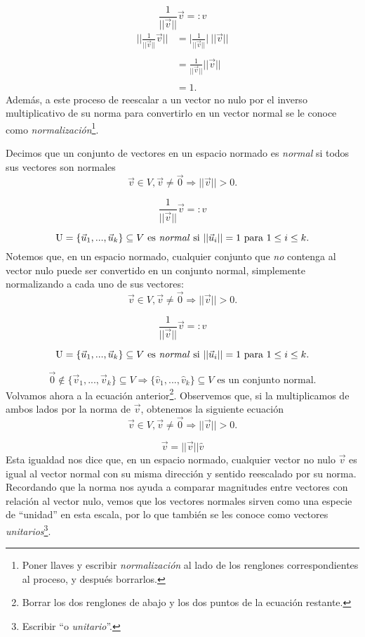 \documentclass[12pt,dvipsnames]{article}
\numberwithin{equation}{section}
\begin{document}
\[
\frac{1}{||\vec{v}||} \vec{v} =: \hat{v}
\] 
\begin{align*}
                \bigg|\bigg|\frac{1}{||\vec{v}||} \vec{v} \bigg|\bigg| &= \bigg| \frac{1}{||\vec{v}||} \bigg| \ ||\vec{v}|| \\ \\
                                                                       &= \frac{1}{||\vec{v}||} ||\vec{v}|| \\ \\
                                                                       &=1.
\end{align*}
Además, a este proceso de reescalar a un vector no nulo por el inverso multiplicativo de su norma para convertirlo en un vector normal se le conoce como \emph{normalización}\footnote{Poner llaves y escribir \emph{normalización} al lado de los renglones correspondientes al proceso, y después borrarlos.}.

Decimos que un conjunto de vectores en un espacio normado es \emph{normal} si todos sus vectores son normales
\[
    \vec{v}\in V, \vec{v}\neq \vec{0} \Rightarrow ||\vec{v}||>0.
\] 

\[
    \frac{1}{||\vec{v}||} \vec{v} =: \hat{v}
\] 

\[
    \text{U}=\{\vec{u}_1,...,\vec{u}_k\}\subseteq V \ \text{es \emph{normal} si } ||\vec{u}_i|| = 1 \text{ para } 1\le i\le k.
\]
Notemos que, en un espacio normado, cualquier conjunto que \emph{no} contenga al vector nulo puede ser convertido en un conjunto normal, simplemente normalizando a cada uno de sus vectores:
\[
    \vec{v}\in V, \vec{v}\neq \vec{0} \Rightarrow ||\vec{v}||>0.
\] 

\[
    \frac{1}{||\vec{v}||} \vec{v} =: \hat{v}
\] 

\[
    \text{U}=\{\vec{u}_1,...,\vec{u}_k\}\subseteq V \ \text{es \emph{normal} si } ||\vec{u}_i|| = 1 \text{ para } 1\le i\le k.
\]

\[
\vec{0}\notin\{\vec{v}_1,...,\vec{v}_k\}\subseteq V \Rightarrow \{\hat{v}_1, ..., \hat{v}_k\}\subseteq V \text{ es un conjunto normal}.
\] 
Volvamos ahora a la ecuación anterior\footnote{Borrar los dos renglones de abajo y los dos puntos de la ecuación restante.}. Observemos que, si la multiplicamos de ambos lados por la norma de $\vec{v}$, obtenemos la siguiente ecuación
\[
    \vec{v}\in V, \vec{v}\neq \vec{0} \Rightarrow ||\vec{v}||>0.
\] 

\[
    \vec{v}= ||\vec{v}|| \hat{v}
\] 
Esta igualdad nos dice que, en un espacio normado, cualquier vector no nulo $\vec{v}$ es igual al vector normal con su misma dirección y sentido reescalado por su norma. Recordando que la norma nos ayuda a comparar magnitudes entre vectores con relación al vector nulo, vemos que los vectores normales sirven como una especie de ``unidad'' en esta escala, por lo que también se les conoce como vectores \emph{unitarios}\footnote{Escribir ``o \emph{unitario}''.}. 
\end{document}

